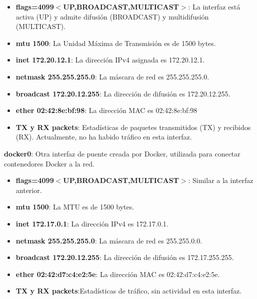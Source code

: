 \begin{itemize}
    \begin{itemize}
        \item \textbf{flags=4099$<$UP,BROADCAST,MULTICAST$>$}:  La interfaz está activa (UP) y admite difusión (BROADCAST) y multidifusión (MULTICAST).\\
        \item \textbf{mtu 1500}: La Unidad Máxima de Transmisión es de 1500 bytes.\\
        \item \textbf{inet 172.20.12.1}: La dirección IPv4 asignada es 172.20.12.1.\\
        \item \textbf{netmask 255.255.255.0}: La máscara de red es 255.255.255.0.\\
        \item \textbf{broadcast 172.20.12.255}: La dirección de difusión es 172.20.12.255.\\
        \item \textbf{ether 02:42:8e:bf:98}: La dirección MAC es 02:42:8e:bf:98\\
        \item \textbf{TX y RX packets}: Estadísticas de paquetes transmitidos (TX) y recibidos (RX). Actualmente, no ha habido tráfico en esta interfaz.
    \end{itemize}

    \textbf{docker0}: Otra interfaz de puente creada por Docker, utilizada para conectar contenedores Docker a la red.
    
    \begin{itemize}
        \item \textbf{flags=4099$<$UP,BROADCAST,MULTICAST$>$}:  Similar a la interfaz anterior.\\
        \item \textbf{mtu 1500}: La MTU es de 1500 bytes.\\
        \item \textbf{inet 172.17.0.1}: La dirección IPv4 es 172.17.0.1.\\
        \item \textbf{netmask 255.255.255.0}: La máscara de red es 255.255.0.0.\\
        \item \textbf{broadcast 172.20.12.255}: La dirección de difusión es 172.17.255.255.\\
        \item \textbf{ether 02:42:d7:c4:e2:5e}: La dirección MAC es 02:42:d7:c4:e2:5e.\\
        \item \textbf{TX y RX packets}:Estadísticas de tráfico, sin actividad en esta interfaz.
    \end{itemize}


\end{itemize}
